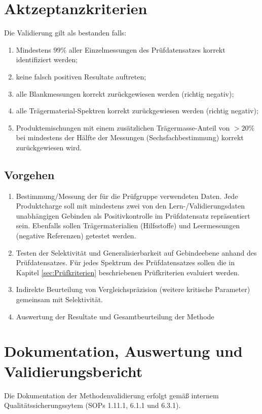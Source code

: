 \documentclass[11pt, a4paper]{article}
\begin{document}
\section{Aktzeptanzkriterien}
Die Validierung gilt als bestanden falls:

\begin{enumerate}
\item Mindestens $99\%$ aller Einzelmessungen des Prüfdatensatzes korrekt identifiziert werden;
\item keine falsch positiven Resultate auftreten;
\item alle Blankmessungen korrekt zurückgewiesen werden (richtig negativ);
\item alle Trägermaterial-Spektren korrekt zurückgewiesen werden (richtig negativ);
\item Produktemischungen mit einem zusätzlichen Trägermasse-Anteil von $> 20\%$  bei mindestens der Hälfte der Messungen (Sechsfachbestimmung) korrekt zurückgewiesen wird.
\end{enumerate}


\subsection{Vorgehen}
\begin{enumerate}
\item Bestimmung/Messung der für die Prüfgruppe verwendeten Daten. Jede Produktcharge soll mit mindestens zwei von den Lern-/Validierungsdaten unabhängigen Gebinden als Positivkontrolle im Prüfdatensatz repräsentiert sein. Ebenfalls sollen Trägermaterialien (Hilfsstoffe) und Leermessungen (negative Referenzen) getestet werden.
\item Testen der Selektivität und Generalisierbarkeit auf Gebindeebene anhand des Prüfdatensatzes. Für jedes Spektrum des Prüfdatensatzes sollen die in Kapitel \ref{sec:Prüfkriterien} beschriebenen Prüfkriterien evaluiert werden.
\item Indirekte Beurteilung von Vergleichspräzision (weitere kritische Parameter) gemeinsam mit Selektivität.
\item Auswertung der Resultate und Gesamtbeurteilung der Methode
\end{enumerate}


\section{Dokumentation, Auswertung und Validierungsbericht}
Die Dokumentation der Methodenvalidierung erfolgt gemäß internem Qualitätssicherungssytem (SOPs 1.11.1, 6.1.1 und 6.3.1).
\end{document}
